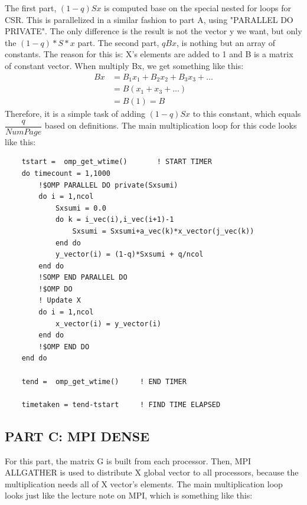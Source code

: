 \documentclass[12pt]{article}
\begin{document}
    \noindent
    The first part, $(1-q)Sx$ is computed base on the special nested for loops for CSR. This is parallelized in a similar fashion to part A, using "PARALLEL DO PRIVATE".  The only difference is the result is not the vector y we want, but only the $(1-q)*S*x$ part. The second part, $qBx$, is nothing but an array of constants. The reason for this is: X's elements are added to 1 and B is a matrix of constant vector. When multiply Bx, we get something like this:
    \begin{align*}
        Bx &= B_1x_1 + B_2x_2 + B_3x_3 + \dots \\
        &= B(x_1 + x_3 + \dots)\\
        &= B(1) = B
    \end{align*}
    \noindent
    Therefore, it is a simple task of adding $(1-q)Sx$ to this constant, which equals $\dfrac{q}{NumPage}$ based on definitions. The main multiplication loop for this code looks like this:
    \begin{lstlisting}
    tstart =  omp_get_wtime()       ! START TIMER
    do timecount = 1,1000
        !$OMP PARALLEL DO private(Sxsumi)
        do i = 1,ncol
            Sxsumi = 0.0
            do k = i_vec(i),i_vec(i+1)-1
                Sxsumi = Sxsumi+a_vec(k)*x_vector(j_vec(k))
            end do
            y_vector(i) = (1-q)*Sxsumi + q/ncol
        end do
        !SOMP END PARALLEL DO
        !$OMP DO 
        ! Update X 
        do i = 1,ncol
            x_vector(i) = y_vector(i)
        end do
        !$OMP END DO        
    end do

    tend =  omp_get_wtime()     ! END TIMER

    timetaken = tend-tstart     ! FIND TIME ELAPSED        
    \end{lstlisting}

    \subsection{PART C: MPI DENSE}
    For this part, the matrix G is built from each processor.  Then, MPI ALLGATHER is used to distribute X global vector to all processors, because the multiplication needs all of X vector's elements. The main multiplication loop looks just like the lecture note on MPI, which is something like this: 
\end{document}
